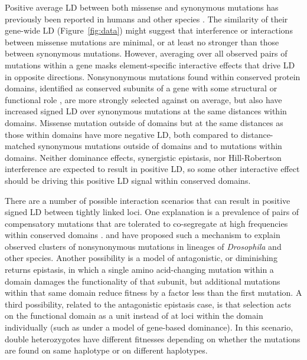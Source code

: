 \documentclass[]{article}
\begin{document}
Positive average LD between both missense and synonymous mutations has
previously been reported in humans and other species \citep{Sohail2017-zq,
Garcia2020-zn, Sandler2021-of}. The similarity of their gene-wide LD
(Figure~\ref{fig:data}) might suggest that interference or interactions between
missense mutations are minimal, or at least no stronger than those between
synonymous mutations. However, averaging over all observed pairs of mutations
within a gene masks element-specific interactive effects that drive LD in
opposite directions. Nonsynonymous mutations found within conserved protein
domains, identified as conserved subunits of a gene with some structural or
functional role \citep{Stanek2020-pa}, are more strongly selected against on
average, but also have increased signed LD over synonymous mutations at the
same distances within domains. Missense mutation outside of domains but at the
same distances as those within domains have more negative LD, both compared to
distance-matched synonymous mutations outside of domains and to mutations
within domains. Neither dominance effects, synergistic epistasis, nor
Hill-Robertson interference are expected to result in positive LD, so some
other interactive effect should be driving this positive LD signal within
conserved domains.

There are a number of possible interaction scenarios that can result in
positive signed LD between tightly linked loci. One explanation is a prevalence
of pairs of compensatory mutations that are tolerated to co-segregate at high
frequencies within conserved domains \citep{Yeang2007-gj,Ivankov2014-tn}.
\citet{Callahan2011-ac} and \citet{Taverner2020-lk} have proposed such a
mechanism to explain observed clusters of nonsynonymous mutations in lineages
of \emph{Drosophila} and other species. Another possibility is a model of
antagonistic, or diminishing returns epistasis, in which a single amino
acid-changing mutation within a domain damages the functionality of that
subunit, but additional mutations within that same domain reduce fitness by a
factor less than the first mutation. A third possibility, related to the
antagonistic epistasis case, is that selection acts on the functional domain as
a unit instead of at loci within the domain individually (such as under a model
of gene-based dominance). In this scenario, double heterozygotes have different
fitnesses depending on whether the mutations are found on same haplotype or on
different haplotypes.
\end{document}
